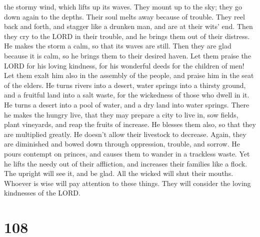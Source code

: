 the stormy wind, which lifts up its waves.  They mount up
to the sky; they go down again to the depths. Their soul melts away
because of trouble.  They reel back and forth, and
stagger like a drunken man, and are at their wits' end. 
Then they cry to the LORD in their trouble, and he brings them out of
their distress.  He makes the storm a calm, so that its
waves are still.  Then they are glad because it is calm,
so he brings them to their desired haven.  Let them
praise the LORD for his loving kindness, for his wonderful deeds for the
children of men!  Let them exalt him also in the assembly
of the people, and praise him in the seat of the elders. 
He turns rivers into a desert, water springs into a thirsty ground,
 and a fruitful land into a salt waste, for the
wickedness of those who dwell in it.  He turns a desert
into a pool of water, and a dry land into water springs. 
There he makes the hungry live, that they may prepare a city to live in,
 sow fields, plant vineyards, and reap the fruits of
increase.  He blesses them also, so that they are
multiplied greatly. He doesn't allow their livestock to decrease.
 Again, they are diminished and bowed down through
oppression, trouble, and sorrow.  He pours contempt on
princes, and causes them to wander in a trackless waste. 
Yet he lifts the needy out of their affliction, and increases their
families like a flock.  The upright will see it, and be
glad. All the wicked will shut their mouths.  Whoever is
wise will pay attention to these things. They will consider the loving
kindnesses of the LORD.

\hypertarget{section-100}{%
\section{108}\label{section-100}}

